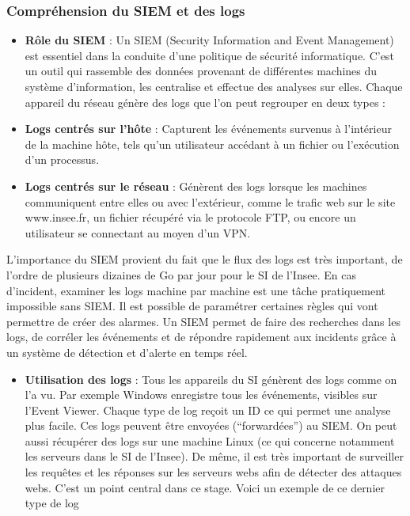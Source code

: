 \documentclass[
  letterpaper,
  DIV=11,
  numbers=noendperiod]{scrartcl}
\providecommand{\tightlist}{%
  \setlength{\itemsep}{0pt}\setlength{\parskip}{0pt}}\usepackage{longtable,booktabs,array}
\begin{document}
\subsubsection{Compréhension du SIEM et des
logs}\label{compruxe9hension-du-siem-et-des-logs}

\begin{itemize}
\item
  \textbf{Rôle du SIEM} : Un SIEM (Security Information and Event
  Management) est essentiel dans la conduite d'une politique de sécurité
  informatique. C'est un outil qui rassemble des données provenant de
  différentes machines du système d'information, les centralise et
  effectue des analyses sur elles. Chaque appareil du réseau génère des
  logs que l'on peut regrouper en deux types :
\item
  \textbf{Logs centrés sur l'hôte} : Capturent les événements survenus à
  l'intérieur de la machine hôte, tels qu'un utilisateur accédant à un
  fichier ou l'exécution d'un processus.
\item
  \textbf{Logs centrés sur le réseau} : Génèrent des logs lorsque les
  machines communiquent entre elles ou avec l'extérieur, comme le trafic
  web sur le site www.insee.fr, un fichier récupéré via le protocole
  FTP, ou encore un utilisateur se connectant au moyen d'un VPN.
\end{itemize}

L'importance du SIEM provient du fait que le flux des logs est très
important, de l'ordre de plusieurs dizaines de Go par jour pour le SI de
l'Insee. En cas d'incident, examiner les logs machine par machine est
une tâche pratiquement impossible sans SIEM. Il est possible de
paramétrer certaines règles qui vont permettre de créer des alarmes. Un
SIEM permet de faire des recherches dans les logs, de corréler les
événements et de répondre rapidement aux incidents grâce à un système de
détection et d'alerte en temps réel.

\begin{itemize}
\tightlist
\item
  \textbf{Utilisation des logs} : Tous les appareils du SI génèrent des
  logs comme on l'a vu. Par exemple Windows enregistre tous les
  événements, visibles sur l'Event Viewer. Chaque type de log reçoit un
  ID ce qui permet une analyse plus facile. Ces logs peuvent être
  envoyées (``forwardées'') au SIEM. On peut aussi récupérer des logs
  sur une machine Linux (ce qui concerne notamment les serveurs dans le
  SI de l'Insee). De même, il est très important de surveiller les
  requêtes et les réponses sur les serveurs webs afin de détecter des
  attaques webs. C'est un point central dans ce stage. Voici un exemple
  de ce dernier type de log
\end{itemize}
\end{document}
